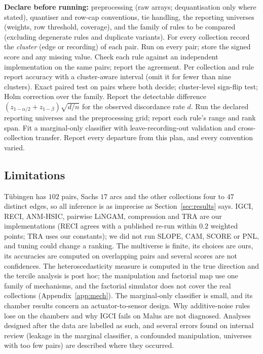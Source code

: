 \begin{algorithm}[t]
\caption{Evaluating direction rules on a pair benchmark (the protocol of this study, as a checklist).}\label{alg:protocol}
\begin{algorithmic}[1]
\State \textbf{Declare before running:} preprocessing (raw arrays; dequantisation only where stated), quantiser and row-cap conventions, tie handling, the reporting universes (weights, row threshold, coverage), and the family of rules to be compared (excluding degenerate rules and duplicate variants).
\State For every collection record the \emph{cluster} (edge or recording) of each pair.
  \State Run on every pair; store the signed score and any missing value.
\EndFor
\State Check each rule against an independent implementation on the same pairs; report the agreement.
\State Per collection and rule report accuracy with a cluster-aware interval (omit it for fewer than nine clusters).
  \State Exact paired test on pairs where both decide; cluster-level sign-flip test; Holm correction over the family.
\EndFor
\State Report the detectable difference $(z_{1-\alpha/2}+z_{1-\beta})\sqrt{d/n}$ for the observed discordance rate $d$.
\State Run the declared reporting universes and the preprocessing grid; report each rule's range and rank span.
\State Fit a marginal-only classifier with leave-recording-out validation and cross-collection transfer.
\State Report every departure from this plan, and every convention varied.
\end{algorithmic}
\end{algorithm}

\subsection{Limitations}\label{sec:limits}
T\"ubingen has $102$ pairs, Sachs $17$ arcs and the other collections four to $47$ distinct edges, so all inference is as imprecise as Section~\ref{sec:results} says. IGCI, RECI, ANM-HSIC, pairwise LiNGAM, compression and TRA are our implementations (RECI agrees with a published re-run within $0.2$ weighted points; TRA uses our constants); we did not run SLOPE, CAM, SCORE or PNL, and tuning could change a ranking. The multiverse is finite, its choices are ours, its accuracies are computed on overlapping pairs and several scores are not confidences. The heteroscedasticity measure is computed in the true direction and the tercile analysis is post hoc; the manipulation and factorial map use one family of mechanisms, and the factorial simulator does not cover the real collections (Appendix~\ref{app:mech}). The marginal-only classifier is small, and its chamber results concern an actuator-to-sensor design. Why additive-noise rules lose on the chambers and why IGCI fails on Malus are not diagnosed. Analyses designed after the data are labelled as such, and several errors found on internal review (leakage in the marginal classifier, a confounded manipulation, universes with too few pairs) are described where they occurred.
